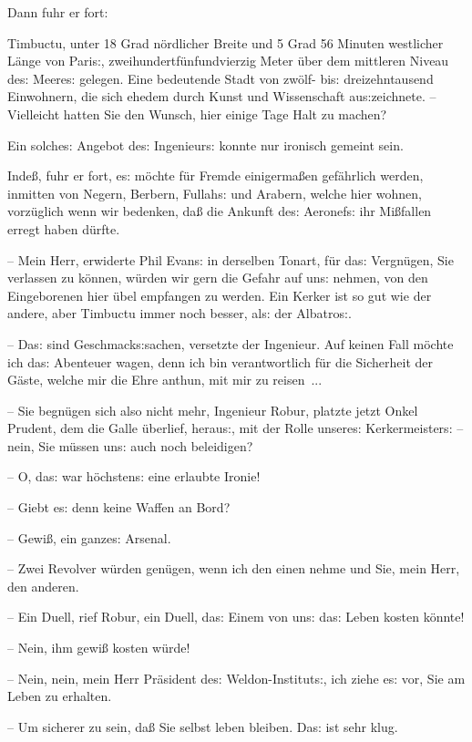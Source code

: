 \documentclass[oneside,12pt]{book}
\newcommand{\s}{s:}
\begin{document}
Dann fuhr er fort:

{\glqq}Timbuctu, unter 18 Grad n\"ordlicher Breite und 5 Grad 56
Minuten westlicher L\"ange von Pari{\s}, zweihundertf\"unfundvierzig
Meter \"uber dem mittleren Niveau de{\s} Meere{\s} gelegen. Eine
bedeutende Stadt von zw\"olf- bi{\s} dreizehntausend Einwohnern, die
sich ehedem durch Kunst und Wissenschaft au{\s}zeichnete. --
Vielleicht hatten Sie den Wunsch, hier einige Tage Halt zu
machen?{\grqq}

Ein solche{\s} Angebot de{\s} Ingenieur{\s} konnte nur ironisch
gemeint sein.

{\glqq}Inde{\ss}, fuhr er fort, e{\s} m\"ochte f\"ur Fremde
einigerma{\ss}en gef\"ahrlich werden, inmitten von Negern, Berbern,
Fullah{\s} und Arabern, welche hier wohnen, vorz\"uglich wenn wir
bedenken, da{\ss} die Ankunft de{\s} Aeronef{\s} ihr Mi{\ss}fallen
erregt haben d\"urfte.

-- Mein Herr, erwiderte Phil Evan{\s} in derselben Tonart, f\"ur
da{\s} Vergn\"ugen, Sie verlassen zu k\"onnen, w\"urden wir gern die
Gefahr auf un{\s} nehmen, von den Eingeborenen hier \"ubel empfangen
zu werden. Ein Kerker ist so gut wie der andere, aber Timbuctu immer
noch besser, al{\s} der {\glqq}Albatro{\s}{\grqq}.

-- Da{\s} sind Geschmack{\s}sachen, versetzte der Ingenieur. Auf
keinen Fall m\"ochte ich da{\s} Abenteuer wagen, denn ich bin
verantwortlich f\"ur die Sicherheit der G\"aste, welche mir die Ehre
anthun, mit mir zu reisen~...

-- Sie begn\"ugen sich also nicht mehr, Ingenieur Robur, platzte
jetzt Onkel Prudent, dem die Galle \"uberlief, herau{\s}, mit der
Rolle unsere{\s} Kerkermeister{\s} -- nein, Sie m\"ussen un{\s} auch
noch beleidigen?

-- O, da{\s} war h\"ochsten{\s} eine erlaubte Ironie!

-- Giebt e{\s} denn keine Waffen an Bord?

-- Gewi{\ss}, ein ganze{\s} Arsenal.

-- Zwei Revolver w\"urden gen\"ugen, wenn ich den einen nehme und
Sie, mein Herr, den anderen.

-- Ein Duell, rief Robur, ein Duell, da{\s} Einem von un{\s} da{\s}
Leben kosten k\"onnte!

-- Nein, ihm gewi{\ss} kosten w\"urde!

-- Nein, nein, mein Herr Pr\"asident de{\s} Weldon-Institut{\s}, ich
ziehe e{\s} vor, Sie am Leben zu erhalten.

-- Um sicherer zu sein, da{\ss} Sie selbst leben bleiben. Da{\s} ist
sehr klug.
\end{document}
